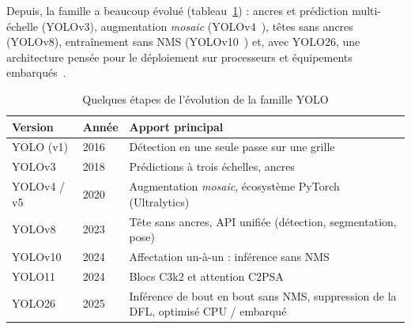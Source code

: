 Depuis, la famille a beaucoup évolué (tableau~\ref{tab:yolo}) : ancres et prédiction multi-échelle (YOLOv3),
augmentation \textit{mosaic} (YOLOv4~\cite{bochkovskiy2020yolov4}), têtes sans ancres (YOLOv8), entraînement sans
NMS (YOLOv10~\cite{wang2024yolov10}) et, avec YOLO26, une architecture pensée pour le déploiement sur processeurs
et équipements embarqués~\cite{ultralytics26}.

\begin{table}[H]
\centering\small
\caption{Quelques étapes de l'évolution de la famille YOLO}
\label{tab:yolo}
\begin{tabular}{lll}
\toprule
\textbf{Version} & \textbf{Année} & \textbf{Apport principal} \\
\midrule
YOLO (v1)   & 2016 & Détection en une seule passe sur une grille \\
YOLOv3      & 2018 & Prédictions à trois échelles, ancres \\
YOLOv4 / v5 & 2020 & Augmentation \textit{mosaic}, écosystème PyTorch (Ultralytics) \\
YOLOv8      & 2023 & Tête sans ancres, API unifiée (détection, segmentation, pose) \\
YOLOv10     & 2024 & Affectation un-à-un : inférence sans NMS \\
YOLO11      & 2024 & Blocs C3k2 et attention C2PSA \\
YOLO26      & 2025 & Inférence de bout en bout sans NMS, suppression de la DFL, optimisé CPU / embarqué \\
\bottomrule
\end{tabular}
\end{table}

